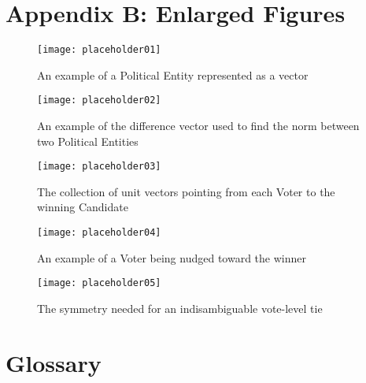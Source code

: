 \documentclass[12pt]{article}
\begin{document}
\newpage
\section{Appendix B: Enlarged Figures} \label{AppB}
\setcounter{figure}{0}


\begin{figure}[H]
\centering
\texttt{[image: placeholder01]}
\caption{\footnotesize An example of a Political Entity represented as a vector}
\end{figure}

\begin{figure}[H]
\centering
\texttt{[image: placeholder02]}
\caption{\footnotesize An example of the difference vector used to find the norm between two Political Entities}
\end{figure}

\begin{figure}[H]
\centering
\texttt{[image: placeholder03]}
\caption{\footnotesize The collection of unit vectors pointing from each Voter to the winning Candidate}
\end{figure}

\begin{figure}[H]
\centering
\texttt{[image: placeholder04]}
\caption{\footnotesize An example of a Voter being nudged toward the winner}
\end{figure}

\begin{figure}[H]
\centering
\texttt{[image: placeholder05]}
\caption{\footnotesize The symmetry needed for an indisambiguable vote-level tie}
\end{figure}

\newpage
\section{Glossary} \label{Glossary}
\end{document}
